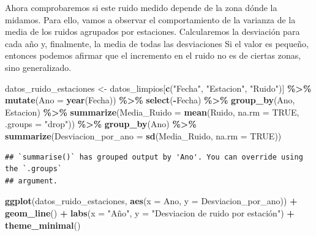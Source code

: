 \documentclass[notspecified,article,submit,moreauthors,pdftex]{Definitions/mdpi}
\newenvironment{Shaded}{\begin{snugshade}}{\end{snugshade}}
\newcommand{\AttributeTok}[1]{\textcolor[rgb]{0.13,0.29,0.53}{#1}}
\newcommand{\ConstantTok}[1]{\textcolor[rgb]{0.56,0.35,0.01}{#1}}
\newcommand{\FunctionTok}[1]{\textcolor[rgb]{0.13,0.29,0.53}{\textbf{#1}}}
\newcommand{\NormalTok}[1]{#1}
\newcommand{\OtherTok}[1]{\textcolor[rgb]{0.56,0.35,0.01}{#1}}
\newcommand{\SpecialCharTok}[1]{\textcolor[rgb]{0.81,0.36,0.00}{\textbf{#1}}}
\newcommand{\StringTok}[1]{\textcolor[rgb]{0.31,0.60,0.02}{#1}}
\begin{document}
Ahora comprobaremos si este ruido medido depende de la zona dónde la
midamos. Para ello, vamos a observar el comportamiento de la varianza de
la media de los ruidos agrupados por estaciones. Calcularemos la
desviación para cada año y, finalmente, la media de todas las
desviaciones Si el valor es pequeño, entonces podemos afirmar que el
incremento en el ruido no es de ciertas zonas, sino generalizado.

\begin{Shaded}
\begin{Highlighting}[]
\NormalTok{datos\_ruido\_estaciones }\OtherTok{\textless{}{-}}
\NormalTok{  datos\_limpios[}\FunctionTok{c}\NormalTok{(}\StringTok{"Fecha"}\NormalTok{, }\StringTok{"Estacion"}\NormalTok{, }\StringTok{"Ruido"}\NormalTok{)] }\SpecialCharTok{\%\textgreater{}\%}
  \FunctionTok{mutate}\NormalTok{(}\AttributeTok{Ano =} \FunctionTok{year}\NormalTok{(Fecha)) }\SpecialCharTok{\%\textgreater{}\%}
  \FunctionTok{select}\NormalTok{(}\SpecialCharTok{{-}}\NormalTok{Fecha) }\SpecialCharTok{\%\textgreater{}\%}
  \FunctionTok{group\_by}\NormalTok{(Ano, Estacion) }\SpecialCharTok{\%\textgreater{}\%}
  \FunctionTok{summarize}\NormalTok{(}\AttributeTok{Media\_Ruido =} \FunctionTok{mean}\NormalTok{(Ruido, }\AttributeTok{na.rm =} \ConstantTok{TRUE}\NormalTok{, }\AttributeTok{.groups =} \StringTok{"drop"}\NormalTok{)) }\SpecialCharTok{\%\textgreater{}\%}
  \FunctionTok{group\_by}\NormalTok{(Ano) }\SpecialCharTok{\%\textgreater{}\%}
  \FunctionTok{summarize}\NormalTok{(}\AttributeTok{Desviacion\_por\_ano =} \FunctionTok{sd}\NormalTok{(Media\_Ruido, }\AttributeTok{na.rm =} \ConstantTok{TRUE}\NormalTok{))}
\end{Highlighting}
\end{Shaded}

\begin{verbatim}
## `summarise()` has grouped output by 'Ano'. You can override using the `.groups`
## argument.
\end{verbatim}

\begin{Shaded}
\begin{Highlighting}[]
\FunctionTok{ggplot}\NormalTok{(datos\_ruido\_estaciones, }\FunctionTok{aes}\NormalTok{(}\AttributeTok{x =}\NormalTok{ Ano, }\AttributeTok{y =}\NormalTok{ Desviacion\_por\_ano)) }\SpecialCharTok{+}
  \FunctionTok{geom\_line}\NormalTok{() }\SpecialCharTok{+}
  \FunctionTok{labs}\NormalTok{(}\AttributeTok{x =} \StringTok{"Año"}\NormalTok{, }\AttributeTok{y =} \StringTok{"Desviacion de ruido por estación"}\NormalTok{) }\SpecialCharTok{+}
  \FunctionTok{theme\_minimal}\NormalTok{()}
\end{Highlighting}
\end{Shaded}
\end{document}
